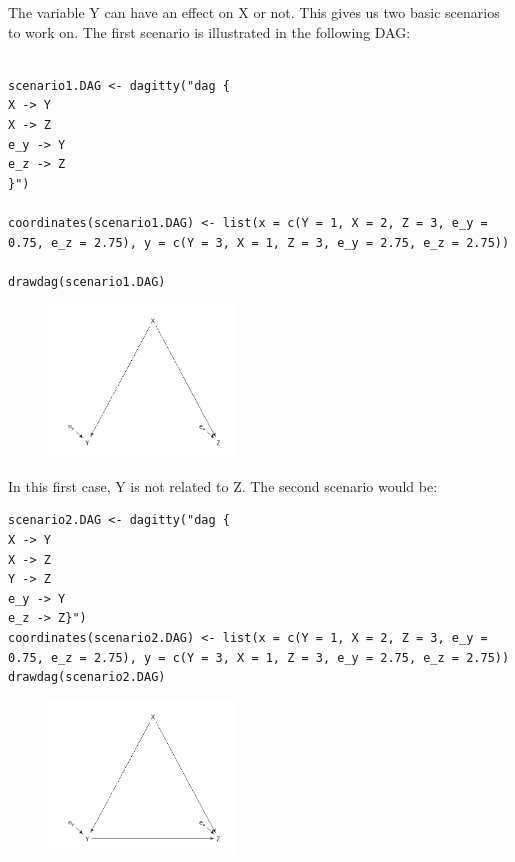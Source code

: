 \documentclass{article}
\begin{document}
The variable Y can have an effect on X or not. This gives us two basic scenarios to work on. The first scenario is illustrated in the following DAG:

\begin{lstlisting}

scenario1.DAG <- dagitty("dag {
X -> Y
X -> Z
e_y -> Y
e_z -> Z
}")

coordinates(scenario1.DAG) <- list(x = c(Y = 1, X = 2, Z = 3, e_y = 0.75, e_z = 2.75), y = c(Y = 3, X = 1, Z = 3, e_y = 2.75, e_z = 2.75))

drawdag(scenario1.DAG)

\end{lstlisting}

\begin{figure}[h]
\includegraphics[width=5cm]{scenario1.DAG.png}
\centering
\end{figure}

In this first case, Y is not related to Z.
The second scenario would be:

\begin{lstlisting}
scenario2.DAG <- dagitty("dag {
X -> Y
X -> Z
Y -> Z
e_y -> Y
e_z -> Z}")
coordinates(scenario2.DAG) <- list(x = c(Y = 1, X = 2, Z = 3, e_y = 0.75, e_z = 2.75), y = c(Y = 3, X = 1, Z = 3, e_y = 2.75, e_z = 2.75))
drawdag(scenario2.DAG)
\end{lstlisting}

\begin{figure}[h]
\includegraphics[width=5cm]{scenario2.DAG.png}
\centering
\end{figure}
\end{document}
